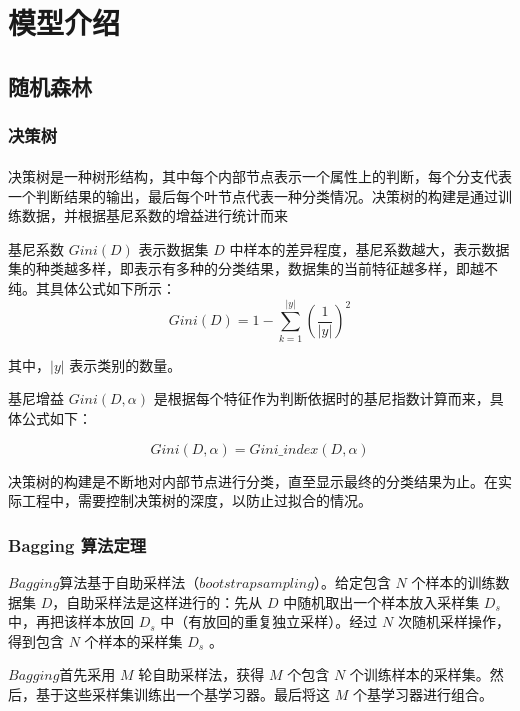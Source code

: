 \documentclass[withoutpreface,bwprint]{cumcmthesis}
\begin{document}

\section{模型介绍}

\subsection{随机森林}

\subsubsection{决策树}

决策树\textsuperscript{\cite{cramer1976estimation}}是一种树形结构，其中每个内部节点表示一个属性上的判断，每个分支代表一个判断结果的输出，最后每个叶节点代表一种分类情况。决策树的构建是通过训练数据，并根据基尼系数的增益进行统计而来
\par 基尼系数 \( Gini(D) \) 表示数据集 \( D \) 中样本的差异程度，基尼系数越大，表示数据集的种类越多样，即表示有多种的分类结果，数据集的当前特征越多样，即越不纯。其具体公式如下所示：
\[
Gini(D) = 1 - \sum_{k=1}^{|y|} \left( \frac{1}{|y|} \right)^2
\]

其中，\( |y| \) 表示类别的数量。

基尼增益 \( Gini(D, \alpha) \) 是根据每个特征作为判断依据时的基尼指数计算而来，具体公式如下：

\[
Gini(D, \alpha) = Gini\_index(D, \alpha)
\]

决策树的构建是不断地对内部节点进行分类，直至显示最终的分类结果为止。在实际工程中，需要控制决策树的深度，以防止过拟合的情况。

\subsubsection{Bagging 算法定理}

\(Bagging\)算法基于自助采样法（\(bootstrap sampling\)）。给定包含 \( N \) 个样本的训练数据集 \( D \)，自助采样法是这样进行的：先从 \( D \) 中随机取出一个样本放入采样集 \( D_s \) 中，再把该样本放回 \( D_s \) 中（有放回的重复独立采样）。经过 \( N \) 次随机采样操作，得到包含 \( N \) 个样本的采样集 \( D_s \) 。

\(Bagging\)首先采用 \( M \) 轮自助采样法，获得 \( M \) 个包含 \( N \) 个训练样本的采样集。然后，基于这些采样集训练出一个基学习器。最后将这 \( M \) 个基学习器进行组合。
\end{document}
